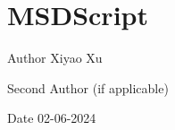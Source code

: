 \chapter{MSDScript}
\hypertarget{index}{}\label{index}
\begin{DoxyAuthor}{Author}
Xiyao Xu 

Second Author (if applicable) 
\end{DoxyAuthor}
\begin{DoxyDate}{Date}
02-\/06-\/2024 
\end{DoxyDate}
